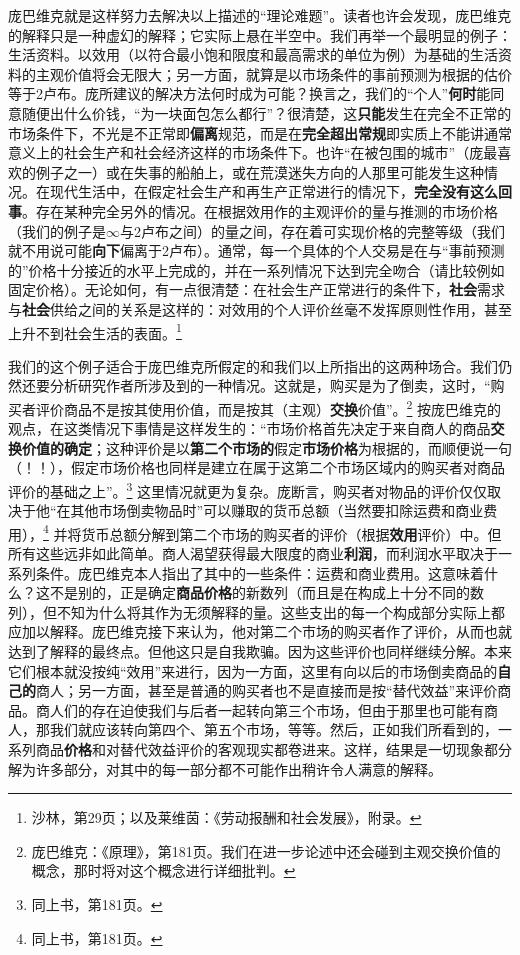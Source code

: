 \documentclass[fontset=fandol, a4paper, 12pt, openright]{ctexbook}
\begin{document}
庞巴维克就是这样努力去解决以上描述的“理论难题”。读者也许会发现，庞巴维克的解释只是一种虚幻的解释；它实际上悬在半空中。我们再举一个最明显的例子：生活资料。以效用（以符合最小饱和限度和最高需求的单位为例）为基础的生活资料的主观价值将会无限大；另一方面，就算是以市场条件的事前预测为根据的估价等于2卢布。庞所建议的解决方法何时成为可能？换言之，我们的“个人”\textbf{何时}能同意随便出什么价钱，“为一块面包怎么都行”？很清楚，这\textbf{只能}发生在完全不正常的市场条件下，不光是不正常即\textbf{偏离}规范，而是在\textbf{完全超出常规}即实质上不能讲通常意义上的社会生产和社会经济这样的市场条件下。也许“在被包围的城市”（庞最喜欢的例子之一）或在失事的船舶上，或在荒漠迷失方向的人那里可能发生这种情况。在现代生活中，在假定社会生产和再生产正常进行的情况下，\textbf{完全没有这么回事}。存在某种完全另外的情况。在根据效用作的主观评价的量与推测的市场价格（我们的例子是$\infty$与2卢布之间）的量之间，存在着可实现价格的完整等级（我们就不用说可能\textbf{向下}偏离于2卢布）。通常，每一个具体的个人交易是在与“事前预测的”价格十分接近的水平上完成的，并在一系列情况下达到完全吻合（请比较例如固定价格）。无论如何，有一点很清楚：在社会生产正常进行的条件下，\textbf{社会}需求与\textbf{社会}供给之间的关系是这样的：对效用的个人评价丝毫不发挥原则性作用，甚至上升不到社会生活的表面。\footnote{沙林，第29页；以及莱维茵：《劳动报酬和社会发展》，附录。}

我们的这个例子适合于庞巴维克所假定的和我们以上所指出的这两种场合。我们仍然还要分析研究作者所涉及到的一种情况。这就是，购买是为了倒卖，这时，“购买者评价商品不是按其使用价值，而是按其（主观）\textbf{交换}价值”。\footnote{庞巴维克：《原理》，第181页。我们在进一步论述中还会碰到主观交换价值的概念，那时将对这个概念进行详细批判。} 按庞巴维克的观点，在这类情况下事情是这样发生的：“市场价格首先决定于来自商人的商品\textbf{交换价值的确定}；这种评价是以\textbf{第二个市场的}假定\textbf{市场价格}为根据的，而顺便说一句（！！），假定市场价格也同样是建立在属于这第二个市场区域内的购买者对商品评价的基础之上”。\footnote{同上书，第181页。} 这里情况就更为复杂。庞断言，购买者对物品的评价仅仅取决于他“在其他市场倒卖物品时”可以赚取的货币总额（当然要扣除运费和商业费用），\footnote{同上书，第181页。} 并将货币总额分解到第二个市场的购买者的评价（根据\textbf{效用}评价）中。但所有这些远非如此简单。商人渴望获得最大限度的商业\textbf{利润}，而利润水平取决于一系列条件。庞巴维克本人指出了其中的一些条件：运费和商业费用。这意味着什么？这不是别的，正是确定\textbf{商品价格}的新数列（而且是在构成上十分不同的数列），但不知为什么将其作为无须解释的量。这些支出的每一个构成部分实际上都应加以解释。庞巴维克接下来认为，他对第二个市场的购买者作了评价，从而也就达到了解释的最终点。但他这只是自我欺骗。因为这些评价也同样继续分解。本来它们根本就没按纯“效用”来进行，因为一方面，这里有向以后的市场倒卖商品的\textbf{自己的}商人；另一方面，甚至是普通的购买者也不是直接而是按“替代效益”来评价商品。商人们的存在迫使我们与后者一起转向第三个市场，但由于那里也可能有商人，那我们就应该转向第四个、第五个市场，等等。然后，正如我们所看到的，一系列商品\textbf{价格}和对替代效益评价的客观现实都卷进来。这样，结果是一切现象都分解为许多部分，对其中的每一部分都不可能作出稍许令人满意的解释。
\end{document}
